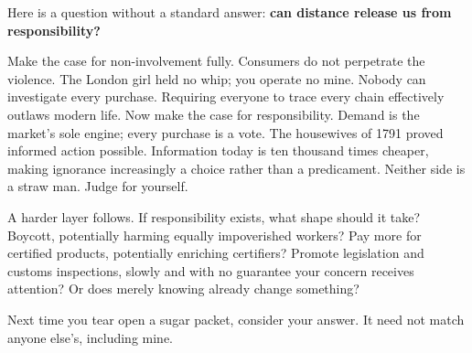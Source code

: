 Here is a question without a standard answer: \textbf{can distance release us from responsibility?}

Make the case for non-involvement fully. Consumers do not perpetrate the violence. The London girl held no whip; you operate no mine. Nobody can investigate every purchase. Requiring everyone to trace every chain effectively outlaws modern life. Now make the case for responsibility. Demand is the market's sole engine; every purchase is a vote. The housewives of 1791 proved informed action possible. Information today is ten thousand times cheaper, making ignorance increasingly a choice rather than a predicament. Neither side is a straw man. Judge for yourself.

A harder layer follows. If responsibility exists, what shape should it take? Boycott, potentially harming equally impoverished workers? Pay more for certified products, potentially enriching certifiers? Promote legislation and customs inspections, slowly and with no guarantee your concern receives attention? Or does merely knowing already change something?

Next time you tear open a sugar packet, consider your answer. It need not match anyone else's, including mine.
